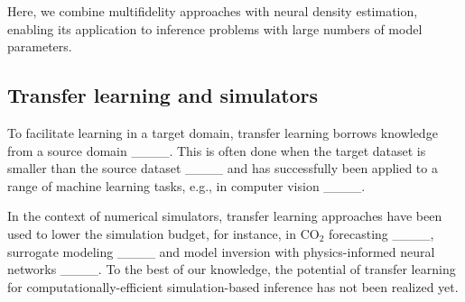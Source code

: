 



Here, we combine multifidelity approaches with neural density estimation, enabling its application to inference problems with large numbers of model parameters.

\subsection{Transfer learning and simulators} 


To facilitate learning in a target domain, transfer learning borrows knowledge from a source domain ____. This is often done when the target dataset is smaller than the source dataset ____ and has successfully been applied to a range of machine learning tasks, e.g., in computer vision ____. 

In the context of numerical simulators, transfer learning approaches have been used to lower the simulation budget, for instance, in CO$_2$ forecasting ____, surrogate modeling ____ and model inversion with physics-informed neural networks ____. To the best of our knowledge, the potential of transfer learning for computationally-efficient simulation-based inference has not been realized yet.

